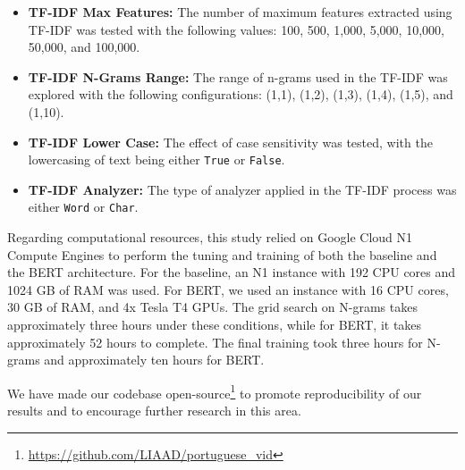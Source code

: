 \begin{itemize}
    \item \textbf{TF-IDF Max Features:} The number of maximum features extracted using TF-IDF was tested with the following values: 100, 500, 1,000, 5,000, 10,000, 50,000, and 100,000.
    \item \textbf{TF-IDF N-Grams Range:} The range of n-grams used in the TF-IDF was explored with the following configurations: (1,1), (1,2), (1,3), (1,4), (1,5), and (1,10).
    \item \textbf{TF-IDF Lower Case:} The effect of case sensitivity was tested, with the lowercasing of text being either \texttt{True} or \texttt{False}.
    \item \textbf{TF-IDF Analyzer:} The type of analyzer applied in the TF-IDF process was either \texttt{Word} or \texttt{Char}.
\end{itemize}


Regarding computational resources, this study relied on Google Cloud N1 Compute Engines to perform the tuning and training of both the baseline and the BERT architecture. For the baseline, an N1 instance with 192 CPU cores and 1024 GB of RAM was used. For BERT, we used an instance with 16 CPU cores, 30 GB of RAM, and 4x Tesla T4 GPUs. The grid search on N-grams takes approximately three hours under these conditions, while for BERT, it takes approximately 52 hours to complete. The final training took three hours for N-grams and approximately ten hours for BERT.

We have made our codebase open-source\footnote{\url{https://github.com/LIAAD/portuguese_vid}} to promote reproducibility of our results and to encourage further research in this area. %